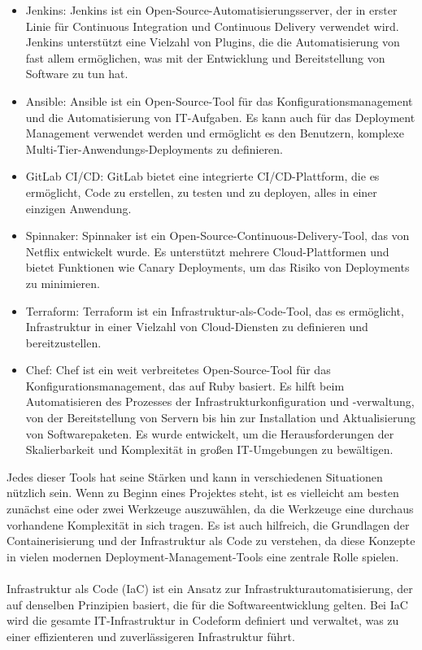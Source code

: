 \begin{itemize} 
\item Jenkins: Jenkins ist ein Open-Source-Automatisierungsserver, der in erster Linie für Continuous Integration und Continuous Delivery verwendet wird. Jenkins unterstützt eine Vielzahl von Plugins, die die Automatisierung von fast allem ermöglichen, was mit der Entwicklung und Bereitstellung von Software zu tun hat.
\item Ansible: Ansible ist ein Open-Source-Tool für das Konfigurationsmanagement und die Automatisierung von IT-Aufgaben. Es kann auch für das Deployment Management verwendet werden und ermöglicht es den Benutzern, komplexe Multi-Tier-Anwendungs-Deployments zu definieren.
\item GitLab CI/CD: GitLab bietet eine integrierte CI/CD-Plattform, die es ermöglicht, Code zu erstellen, zu testen und zu deployen, alles in einer einzigen Anwendung.
\item Spinnaker: Spinnaker ist ein Open-Source-Continuous-Delivery-Tool, das von Netflix entwickelt wurde. Es unterstützt mehrere Cloud-Plattformen und bietet Funktionen wie Canary Deployments, um das Risiko von Deployments zu minimieren.
\item Terraform: Terraform ist ein Infrastruktur-als-Code-Tool, das es ermöglicht, Infrastruktur in einer Vielzahl von Cloud-Diensten zu definieren und bereitzustellen.
\item Chef: Chef ist ein weit verbreitetes Open-Source-Tool für das Konfigurationsmanagement, das auf Ruby basiert. Es hilft beim Automatisieren des Prozesses der Infrastrukturkonfiguration und -verwaltung, von der Bereitstellung von Servern bis hin zur Installation und Aktualisierung von Softwarepaketen. Es wurde entwickelt, um die Herausforderungen der Skalierbarkeit und Komplexität in großen IT-Umgebungen zu bewältigen.
\end{itemize} 
Jedes dieser Tools hat seine Stärken und kann in verschiedenen Situationen nützlich sein. Wenn zu Beginn eines Projektes steht, ist es vielleicht am besten zunächst eine oder zwei Werkzeuge auszuwählen, da die Werkzeuge eine durchaus vorhandene Komplexität in sich tragen. Es ist auch hilfreich, die Grundlagen der Containerisierung und der Infrastruktur als Code zu verstehen, da diese Konzepte in vielen modernen Deployment-Management-Tools eine zentrale Rolle spielen.
\\\\
Infrastruktur als Code (IaC) ist ein Ansatz zur Infrastrukturautomatisierung, der auf denselben Prinzipien basiert, die für die Softwareentwicklung gelten. Bei IaC wird die gesamte IT-Infrastruktur in Codeform definiert und verwaltet, was zu einer effizienteren und zuverlässigeren Infrastruktur führt.
